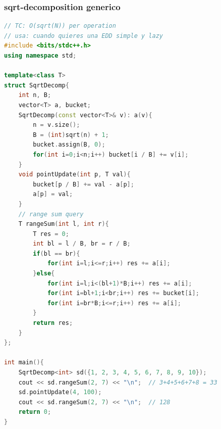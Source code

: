 \subsubsection{sqrt-decomposition generico}
\begin{lstlisting}[style=mystyle, language=C++]
// TC: O(sqrt(N)) per operation
// usa: cuando quieres una EDD simple y lazy
#include <bits/stdc++.h>
using namespace std;

template<class T>
struct SqrtDecomp{
	int n, B;
	vector<T> a, bucket;
	SqrtDecomp(const vector<T>& v): a(v){
		n = v.size();
		B = (int)sqrt(n) + 1;
		bucket.assign(B, 0);
		for(int i=0;i<n;i++) bucket[i / B] += v[i];
	}
	void pointUpdate(int p, T val){
		bucket[p / B] += val - a[p];
		a[p] = val;
	}
	// range sum query
	T rangeSum(int l, int r){
		T res = 0;
		int bl = l / B, br = r / B;
		if(bl == br){
			for(int i=l;i<=r;i++) res += a[i];
		}else{
			for(int i=l;i<(bl+1)*B;i++) res += a[i];
			for(int i=bl+1;i<br;i++) res += bucket[i];
			for(int i=br*B;i<=r;i++) res += a[i];
		}
		return res;
	}
};

int main(){
	SqrtDecomp<int> sd({1, 2, 3, 4, 5, 6, 7, 8, 9, 10});
	cout << sd.rangeSum(2, 7) << "\n";  // 3+4+5+6+7+8 = 33
	sd.pointUpdate(4, 100);
	cout << sd.rangeSum(2, 7) << "\n";  // 128
	return 0;
}
\end{lstlisting}
